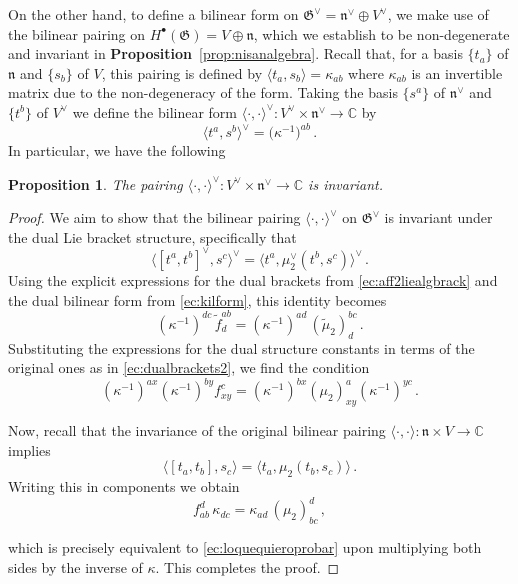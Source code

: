 \documentclass[11pt]{amsart}
\newcommand{\C}{{\mathbb C}}
\newcommand{\fn}{\mathfrak{n}}
\newcommand{\fG}{\mathfrak{G}}
\numberwithin{equation}{section}
\numberwithin{figure}{section}
\numberwithin{table}{section}
\theoremstyle{thm}
\newtheorem{prop}[theorem]{Proposition}
\numberwithin{equation}{subsection}
\theoremstyle{definition}
\theoremstyle{rem}
\begin{document}
On the other hand, to define a bilinear form on \( \mathfrak{G}^\vee = \mathfrak{n}^\vee \oplus V^\vee \), we make use of the bilinear pairing on \( H^\bullet(\mathfrak{G}) = V \oplus \mathfrak{n} \), which we establish to be non-degenerate and invariant in \textbf{Proposition}~\ref{prop:nisanalgebra}. Recall that, for a basis \( \{t_a\} \) of \( \mathfrak{n} \) and \( \{s_b\} \) of \( V \), this pairing is defined by
\(\langle t_a, s_b \rangle = \kappa_{ab}\) where \( \kappa_{ab} \) is an invertible matrix due to the non-degeneracy of the form. Taking the basis $\{s^a\}$ of $\fn^\vee$ and $\{t^b\}$ of $V^\vee$ we define the bilinear form $\langle\cdot,\cdot\rangle^\vee:V^\vee \times \fn^\vee \to \C$ by
\begin{equation}
\label{ec:kilform}
    \langle t^a,s^b\rangle^\vee = \big(\kappa^{-1}\big)^{ab} \,.
\end{equation}
In particular, we have the following
\begin{prop}
    The pairing $\langle \cdot,\cdot\rangle^\vee : V^\vee\times \fn^\vee \to \C$ is invariant. 
\end{prop}

\begin{proof}
We aim to show that the bilinear pairing \(\langle\cdot,\cdot\rangle^\vee\) on \(\fG^\vee\) is invariant under the dual Lie bracket structure, specifically that
\begin{equation}
    \langle [t^a,t^b]^\vee,s^c\rangle^\vee = \langle t^a, \mu_2^\vee(t^b,s^c)\rangle^\vee\,.
\end{equation}
Using the explicit expressions for the dual brackets from \eqref{ec:aff2liealgbrack} and the dual bilinear form from \eqref{ec:kilform}, this identity becomes
\begin{equation}
    (\kappa^{-1})^{dc}\,\tilde{f}^{ab}_d = (\kappa^{-1})^{ad}\,(\tilde{\mu}_2)^{bc}_d\,.
\end{equation}
Substituting the expressions for the dual structure constants in terms of the original ones as in \eqref{ec:dualbrackets2}, we find the condition
\begin{equation}
\label{ec:loquequieroprobar}
    (\kappa^{-1})^{ax}(\kappa^{-1})^{by} f_{xy}^c = (\kappa^{-1})^{bx} (\mu_2)^a_{xy} (\kappa^{-1})^{yc}\,.
\end{equation}

Now, recall that the invariance of the original bilinear pairing \(\langle\cdot,\cdot\rangle:\mathfrak{n} \times V \to \mathbb{C}\) implies
\begin{equation}
    \langle [t_a,t_b], s_c \rangle = \langle t_a, \mu_2(t_b, s_c) \rangle\,.
\end{equation}
Writing this in components we obtain
\begin{equation}
    f_{ab}^d\, \kappa_{dc} = \kappa_{ad} \, (\mu_2)_{bc}^d\,,
\end{equation}


which is precisely equivalent to \eqref{ec:loquequieroprobar} upon multiplying both sides by the inverse of \(\kappa\). This completes the proof.

\end{proof}
\end{document}
